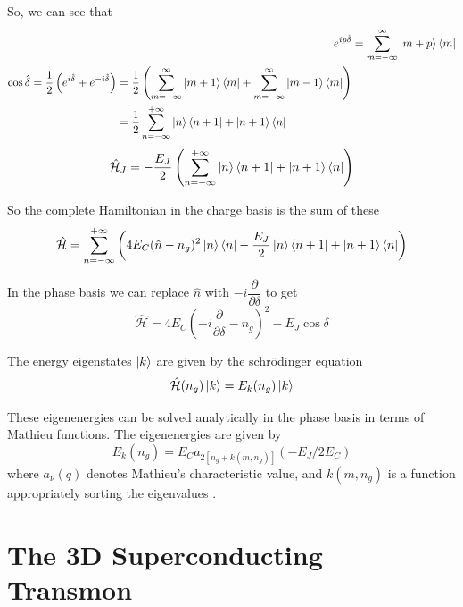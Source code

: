 So, we can see that
\begin{align}
e^{ip\hat{\delta}}&=\sum_{m=-\infty}^\infty \ket{m+p}\bra{m}\\
\begin{split}
\cos\hat{\delta}=\frac{1}{2}\left(e^{i\hat{\delta}}+e^{-i\hat{\delta}}\right)&=\frac{1}{2}\left(\sum_{m=-\infty}^\infty \ket{m+1}\bra{m}+\sum_{m=-\infty}^\infty \ket{m-1}\bra{m}\right)\\
&=\frac{1}{2}\sum_{n=-\infty}^{+\infty}\ket{n}\bra{n+1}+\ket{n+1}\bra{n}
\end{split}
\end{align}
\begin{equation}
\hat{\mathcal{H}}_J=-\frac{E_J}{2}\left(\sum_{n=-\infty}^{+\infty}\ket{n}\bra{n+1}+\ket{n+1}\bra{n}\right)
\end{equation} 

So the complete Hamiltonian in the charge basis is the sum of these
\begin{equation}
\hat{\mathcal{H}}=\sum_{n=-\infty}^{+\infty}\left(4E_C(\hat{n}-n_g)^2\ket{n}\bra{n}-\frac{E_J}{2}\ket{n}\bra{n+1}+\ket{n+1}\bra{n}\right)
\label{eqn:charge basis ham}
\end{equation}

In the phase basis we can replace $\hat{n}$ with $-i\dfrac{\partial}{\partial\delta}$ to get
\begin{equation}
\hat{\mathcal{H}}=4E_C\left(-i\frac{\partial}{\partial\delta}-n_g\right)^2-E_J\cos\delta
\end{equation}

The energy eigenstates $\ket{k}$ are given by the schr\"{o}dinger equation
\begin{equation}
\hat{\mathcal{H}}(n_g)\ket{k}=E_k(n_g)\ket{k}
\end{equation}

These eigenenergies can be solved analytically in the phase basis in terms of Mathieu functions. The eigenenergies are given by
\begin{equation}
E_k(n_g)=E_Ca_{2[n_g+k(m,n_g)]}(-E_J/2E_C)
\end{equation}
where $a_\nu(q)$ denotes Mathieu’s characteristic value, and $k(m,n_g)$ is a function appropriately sorting the eigenvalues \cite{Koch2007a}.

\section{The 3D Superconducting Transmon}

